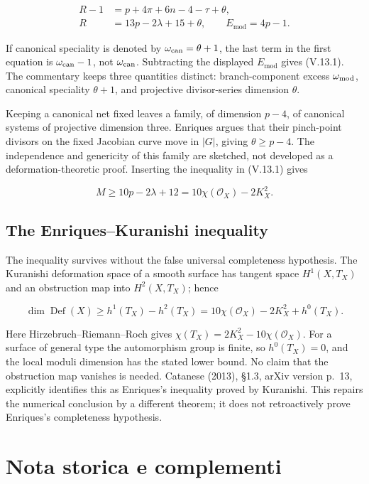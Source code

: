\[
\begin{aligned}
R-1&=p+4\pi+6n-4-\tau+\theta,\\
R&=13p-2\lambda+15+\theta,\qquad E_{\mathrm{mod}}=4p-1.
\end{aligned}
\]

If canonical speciality is denoted by \(\omega_{\rm can}=\theta+1\), the last term in the first equation is \(\omega_{\rm can}-1\), not \(\omega_{\rm can}\). Subtracting the displayed \(E_{\mathrm{mod}}\) gives (V.13.1). The commentary keeps three quantities distinct: branch-component excess \(\omega_{\rm mod}\), canonical speciality \(\theta+1\), and projective divisor-series dimension \(\theta\).

Keeping a canonical net fixed leaves a family, of dimension \(p-4\), of canonical systems of projective dimension three. Enriques argues that their pinch-point divisors on the fixed Jacobian curve move in \(|G|\), giving \(\theta\ge p-4\). The independence and genericity of this family are sketched, not developed as a deformation-theoretic proof. Inserting the inequality in (V.13.1) gives

\[
M\ge10p-2\lambda+12=10\chi(\mathcal O_X)-2K_X^2.
\]

\subsection{The Enriques--Kuranishi inequality}

The inequality survives without the false universal completeness hypothesis. The Kuranishi deformation space of a smooth surface has tangent space \(H^1(X,T_X)\) and an obstruction map into \(H^2(X,T_X)\); hence

\[
\dim\operatorname{Def}(X)
\ge h^1(T_X)-h^2(T_X)
=10\chi(\mathcal O_X)-2K_X^2+h^0(T_X).
\]

Here Hirzebruch--Riemann--Roch gives \(\chi(T_X)=2K_X^2-10\chi(\mathcal O_X)\). For a surface of general type the automorphism group is finite, so \(h^0(T_X)=0\), and the local moduli dimension has the stated lower bound. No claim that the obstruction map vanishes is needed. Catanese (2013), §1.3, arXiv version p.~13, explicitly identifies this as Enriques's inequality proved by Kuranishi. This repairs the numerical conclusion by a different theorem; it does not retroactively prove Enriques's completeness hypothesis.

\section{Nota storica e complementi}
\label{cp1-v-14}

